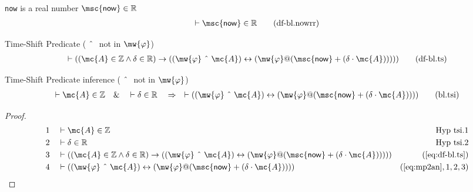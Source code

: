 \begin{metadefinition} {\texttt{now} is a real number} $\mathsf{\msc{now}} \in \mathbb{R}$
\begin{align}
\vdash \mathsf{\msc{now}} \in \mathbb{R}\label{eq:df-bl.nowrr}\tag{df-bl.nowrr}
\end{align}
\end{metadefinition}


\begin{metadefinition} {Time-Shift Predicate} ($~\string^~$ not
in $\mw{\varphi}$)
\begin{align}
\vdash ( ( \mc{A} \in \mathbb{Z} \wedge \delta \in \mathbb{R} ) \rightarrow ( (
    \mw{\varphi} ~\string^~ \mc{A} ) \leftrightarrow ( \mw{\varphi} @ (
    \mathsf{\msc{now}} + ( \delta \cdot \mc{A} ) ) ) )
    )\label{eq:df-bl.ts}\tag{df-bl.ts}
\end{align}
\end{metadefinition}


\begin{lemma} {Time-Shift Predicate inference} ($~\string^~$
not in $\mw{\varphi}$)
\begin{align}
\vdash \mc{A} \in \mathbb{Z}\quad\&\quad \vdash \delta \in
    \mathbb{R}\quad\Rightarrow\quad \vdash ( ( \mw{\varphi} ~\string^~ \mc{A} )
    \leftrightarrow ( \mw{\varphi} @ ( \mathsf{\msc{now}} + ( \delta \cdot \mc{A} )
    ) ) )\label{eq:bl.tsi}\tag{bl.tsi}
\end{align}
\end{lemma}


\begin{proof}
\begin{align}
  1 &&  & \vdash \mc{A} \in \mathbb{Z}&\text{Hyp~tsi.1}\notag%
  \\ 2 &&  & \vdash \delta \in \mathbb{R}&\text{Hyp~tsi.2}\notag%
  \\ 3 &&  & \vdash ( ( \mc{A} \in \mathbb{Z} \wedge \delta \in \mathbb{R} )
     \rightarrow ( ( \mw{\varphi} ~\string^~ \mc{A} )
     \leftrightarrow ( \mw{\varphi} @ ( \mathsf{\msc{now}}
     + ( \delta \cdot \mc{A} ) ) ) )
     )&(\mbox{\ref{eq:df-bl.ts}})\notag
  \\ 4 &&  & \vdash ( ( \mw{\varphi} ~\string^~ \mc{A} ) \leftrightarrow (
     \mw{\varphi} @ ( \mathsf{\msc{now}} + ( \delta \cdot
     \mc{A} ) ) ) )&(\mbox{\ref{eq:mp2an}},1,2,3)\notag
\end{align}
\end{proof}

